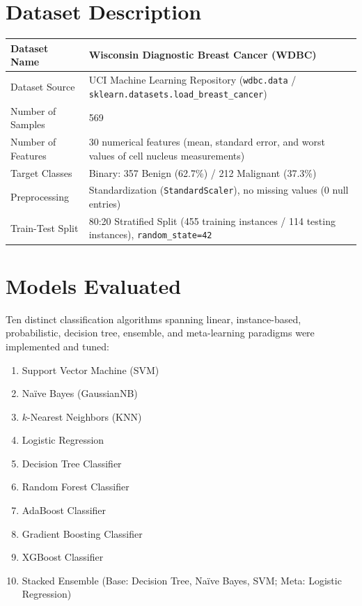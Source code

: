 \documentclass[12pt,a4paper]{article}
\begin{document}
\section{Dataset Description}
\begin{longtable}{|p{6cm}|p{8cm}|}
\hline
Dataset Name & Wisconsin Diagnostic Breast Cancer (WDBC) \\ \hline
Dataset Source & UCI Machine Learning Repository (\texttt{wdbc.data} / \texttt{sklearn.datasets.load\_breast\_cancer}) \\ \hline
Number of Samples & 569 \\ \hline
Number of Features & 30 numerical features (mean, standard error, and worst values of cell nucleus measurements) \\ \hline
Target Classes & Binary: 357 Benign (62.7\%) / 212 Malignant (37.3\%) \\ \hline
Preprocessing & Standardization (\texttt{StandardScaler}), no missing values (0 null entries) \\ \hline
Train-Test Split & 80:20 Stratified Split (455 training instances / 114 testing instances), \texttt{random\_state=42} \\ \hline
\end{longtable}

\section{Models Evaluated}
Ten distinct classification algorithms spanning linear, instance-based, probabilistic, decision tree, ensemble, and meta-learning paradigms were implemented and tuned:
\begin{enumerate}
\item Support Vector Machine (SVM)
\item Na\"ive Bayes (GaussianNB)
\item $k$-Nearest Neighbors (KNN)
\item Logistic Regression
\item Decision Tree Classifier
\item Random Forest Classifier
\item AdaBoost Classifier
\item Gradient Boosting Classifier
\item XGBoost Classifier
\item Stacked Ensemble (Base: Decision Tree, Na\"ive Bayes, SVM; Meta: Logistic Regression)
\end{enumerate}
\end{document}
